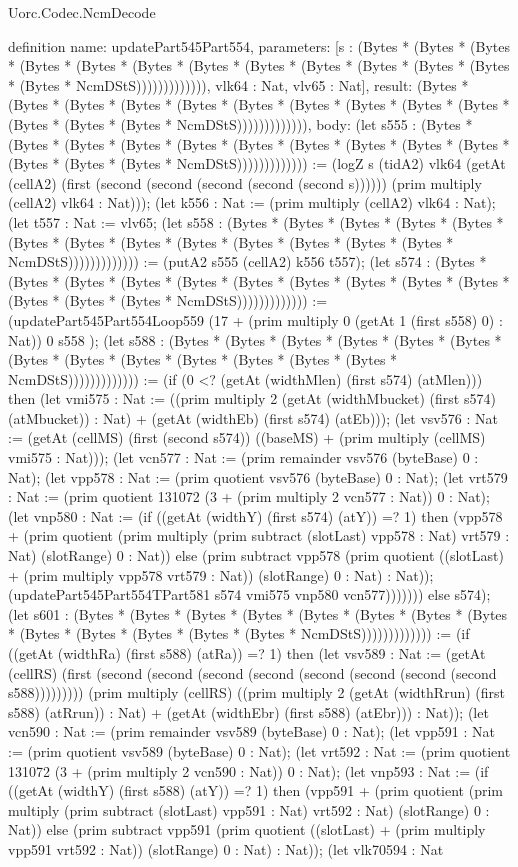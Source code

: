 \begin{lexlean}{Uorc.Codec.NcmDecode}
\begin{semanticmodule}
definition{
  name: updatePart545Part554,
  parameters: [s : (Bytes * (Bytes * (Bytes * (Bytes * (Bytes * (Bytes * (Bytes * (Bytes * (Bytes * (Bytes * (Bytes * (Bytes * (Bytes * NcmDStS))))))))))))), vlk64 : Nat, vlv65 : Nat],
  result: (Bytes * (Bytes * (Bytes * (Bytes * (Bytes * (Bytes * (Bytes * (Bytes * (Bytes * (Bytes * (Bytes * (Bytes * (Bytes * NcmDStS))))))))))))),
  body: (let s555 : (Bytes * (Bytes * (Bytes * (Bytes * (Bytes * (Bytes * (Bytes * (Bytes * (Bytes * (Bytes * (Bytes * (Bytes * (Bytes * NcmDStS))))))))))))) := (logZ s (tidA2) vlk64 (getAt (cellA2) (first (second (second (second (second (second s)))))) (prim multiply (cellA2) vlk64 : Nat))); (let k556 : Nat := (prim multiply (cellA2) vlk64 : Nat); (let t557 : Nat := vlv65; (let s558 : (Bytes * (Bytes * (Bytes * (Bytes * (Bytes * (Bytes * (Bytes * (Bytes * (Bytes * (Bytes * (Bytes * (Bytes * (Bytes * NcmDStS))))))))))))) := (putA2 s555 (cellA2) k556 t557); (let s574 : (Bytes * (Bytes * (Bytes * (Bytes * (Bytes * (Bytes * (Bytes * (Bytes * (Bytes * (Bytes * (Bytes * (Bytes * (Bytes * NcmDStS))))))))))))) := (updatePart545Part554Loop559 (17 + (prim multiply 0 (getAt 1 (first s558) 0) : Nat)) 0 s558 ); (let s588 : (Bytes * (Bytes * (Bytes * (Bytes * (Bytes * (Bytes * (Bytes * (Bytes * (Bytes * (Bytes * (Bytes * (Bytes * (Bytes * NcmDStS))))))))))))) := (if (0 <? (getAt (widthMlen) (first s574) (atMlen))) then (let vmi575 : Nat := ((prim multiply 2 (getAt (widthMbucket) (first s574) (atMbucket)) : Nat) + (getAt (widthEb) (first s574) (atEb))); (let vsv576 : Nat := (getAt (cellMS) (first (second s574)) ((baseMS) + (prim multiply (cellMS) vmi575 : Nat))); (let vcn577 : Nat := (prim remainder vsv576 (byteBase) 0 : Nat); (let vpp578 : Nat := (prim quotient vsv576 (byteBase) 0 : Nat); (let vrt579 : Nat := (prim quotient 131072 (3 + (prim multiply 2 vcn577 : Nat)) 0 : Nat); (let vnp580 : Nat := (if ((getAt (widthY) (first s574) (atY)) =? 1) then (vpp578 + (prim quotient (prim multiply (prim subtract (slotLast) vpp578 : Nat) vrt579 : Nat) (slotRange) 0 : Nat)) else (prim subtract vpp578 (prim quotient ((slotLast) + (prim multiply vpp578 vrt579 : Nat)) (slotRange) 0 : Nat) : Nat)); (updatePart545Part554TPart581 s574 vmi575 vnp580 vcn577))))))) else s574); (let s601 : (Bytes * (Bytes * (Bytes * (Bytes * (Bytes * (Bytes * (Bytes * (Bytes * (Bytes * (Bytes * (Bytes * (Bytes * (Bytes * NcmDStS))))))))))))) := (if ((getAt (widthRa) (first s588) (atRa)) =? 1) then (let vsv589 : Nat := (getAt (cellRS) (first (second (second (second (second (second (second (second (second s588))))))))) (prim multiply (cellRS) ((prim multiply 2 (getAt (widthRrun) (first s588) (atRrun)) : Nat) + (getAt (widthEbr) (first s588) (atEbr))) : Nat)); (let vcn590 : Nat := (prim remainder vsv589 (byteBase) 0 : Nat); (let vpp591 : Nat := (prim quotient vsv589 (byteBase) 0 : Nat); (let vrt592 : Nat := (prim quotient 131072 (3 + (prim multiply 2 vcn590 : Nat)) 0 : Nat); (let vnp593 : Nat := (if ((getAt (widthY) (first s588) (atY)) =? 1) then (vpp591 + (prim quotient (prim multiply (prim subtract (slotLast) vpp591 : Nat) vrt592 : Nat) (slotRange) 0 : Nat)) else (prim subtract vpp591 (prim quotient ((slotLast) + (prim multiply vpp591 vrt592 : Nat)) (slotRange) 0 : Nat) : Nat)); (let vlk70594 : Nat }
\end{semanticmodule}
\end{lexlean}
